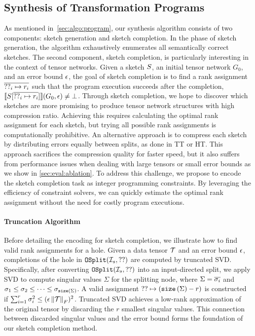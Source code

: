 \subsection{Synthesis of Transformation Programs}\label{sec:algo:fillhole}
%
As mentioned in~\cref{sec:algo:program}, our synthesis algorithm consists of two components: sketch generation and sketch completion.
%
In the phase of sketch generation, the algorithm exhaustively enumerates all semantically correct sketches.
%
The second component, sketch completion, is particularly interesting in the context of tensor networks.
%
Given a sketch $S$, an initial tensor network $G_0$, and an error bound $\epsilon$, the goal of sketch completion is to find a rank assignment $\overline{??_i \mapsto r_i}$  such that the program execution succeeds after the completion, \ie $\llbracket S[\overline{??_i \mapsto r_i}] \rrbracket(G_0, \epsilon) \not= \bot$.
%
Through sketch completion, we hope to discover which sketches are more promising to produce tensor network structures with high compression ratio.
%
Achieving this requires calculating the optimal rank assignment for each sketch, but trying all possible rank assignments is computationally prohibitive.
%
An alternative approach is to compress each sketch by distributing errors equally between splits, as done in TT or HT.
%
This approach sacrifices the compression quality for faster speed, but it also suffers from performance issues when dealing with large tensors or small error bounds as we show in \cref{sec:eval:ablation}.
%
To address this challenge, we propose to encode the sketch completion task as integer programming constraints.
%
By leveraging the efficiency of constraint solvers, we can quickly estimate the optimal rank assignment without the need for costly program executions.

\paragraph{Truncation Algorithm}
%
Before detailing the encoding for sketch completion, we illustrate how to find valid rank assignments for a hole.
%
Given a data tensor $\mathcal{T}$ and an error bound $\epsilon$, completions of the hole in $\mathtt{OSplit}(\mathcal{I}_s, ??)$ are computed by truncated SVD.
%
Specifically, after converting $\mathtt{OSplit}(\mathcal{I}_s, ??)$ into an input-directed split, we apply SVD to compute singular values $\Sigma$ for the splitting node, where $\Sigma = \overline{\sigma_i}$ and $\sigma_1 \leq \sigma_2 \leq \cdots \leq \sigma_{\mathtt{size}\left(\Sigma\right)}$.
%
A valid assignment $?? \mapsto (\mathtt{size}\left(\Sigma\right) - r)$ is constructed if $\sum_{i=1}^{r} \sigma_{i}^2 \leq (\epsilon \left\lVert\mathcal{T}\right\rVert_{F})^2$.
%
Truncated SVD achieves a low-rank approximation of the original tensor by discarding the $r$ smallest singular values.
%
This connection between discarded singular values and the error bound forms the foundation of our sketch completion method.

